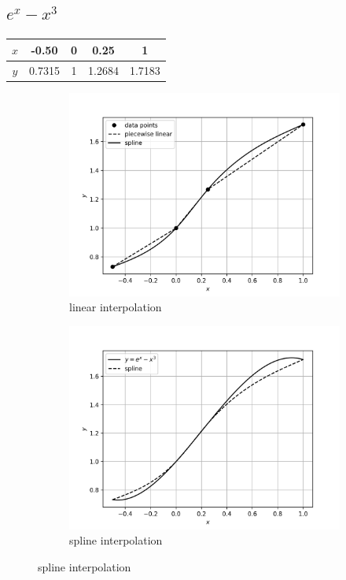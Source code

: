 \documentclass[12,a4paper]{article}
\begin{document}
   \subsection{$e^x - x^3$}
   \begin{table}[H]
       \centering
       \begin{tabular}{|c|c|c|c|c|}
       \hline
        $x$ & -0.50 & 0 & 0.25 & 1\\
        \hline
        $y$ & 0.7315 & 1 & 1.2684 & 1.7183\\
        \hline
       \end{tabular}
   \end{table}
   \begin{figure}[h!]
        \centering
        \begin{subfigure}[t]{0.49\textwidth}
            \includegraphics[width=\textwidth]{plots/sq3a.png}
            \caption{linear interpolation}
            \label{fig:sq3a}
        \end{subfigure}
        \begin{subfigure}[t]{0.49\textwidth}
            \includegraphics[width=\textwidth]{plots/sq3b.png}
            \caption{spline interpolation}
            \label{fig:q3b}
        \end{subfigure}
    \end{figure}
    
\end{document}
